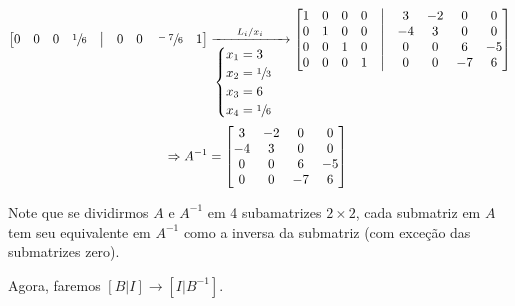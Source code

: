 \documentclass[leqno]{article}
\begin{document}
\begin{enumerate}
\begin{align*}
\begin{bmatrix}
        0 & 0 & 0 & \sfrac{1}{6} & \bigm| & 0 & 0 & \sfrac{-7}{6} & 1\\
        \end{bmatrix}&\xrightarrow[\begin{cases}x_1=3\\x_2=\sfrac{1}{3}\\x_3=6\\x_4=\sfrac{1}{6}\end{cases} ]{L_i/x_i}\begin{bmatrix}
        1 & 0 & 0 & 0 & \bigm| & 3 & -2 & 0 & 0\\
        0 & 1 & 0 & 0 & \bigm| & -4 & 3 & 0 & 0\\
        0 & 0 & 1 & 0 & \bigm| & 0 & 0 & 6 & -5\\
        0 & 0 & 0 & 1 & \bigm| & 0 & 0 & -7 & 6\\
        \end{bmatrix}\\
        \Rightarrow A^{-1}&=\begin{bmatrix}
        3 & -2 & 0 & 0\\
        -4 & 3 & 0 & 0\\
        0 & 0 & 6 & -5\\
        0 & 0 & -7 & 6\\
        \end{bmatrix}
    \end{align*}
    
    Note que se dividirmos $A$ e $A^{-1}$ em 4 subamatrizes $2\times 2$, cada submatriz em $A$ tem seu equivalente em $A^{-1}$ como a inversa da submatriz (com exceção das submatrizes zero).
    
    Agora, faremos $[B|I]\rightarrow[I|B^{-1}]$.
    

\end{enumerate}
\end{document}
